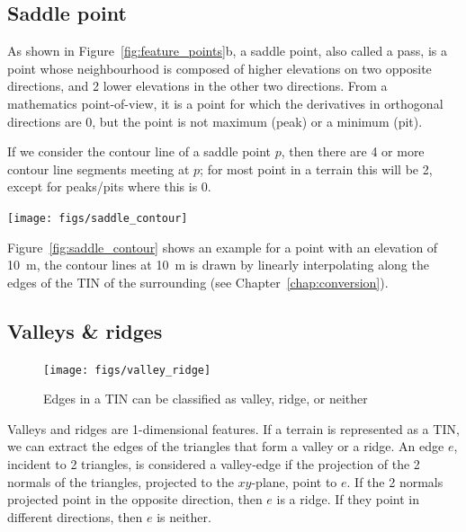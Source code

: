 \subsection{Saddle point}%

As shown in Figure~\ref{fig:feature_points}b, a saddle point, also called a pass, is a point whose neighbourhood is composed of higher elevations on two opposite directions, and 2 lower elevations in the other two directions.
From a mathematics point-of-view, it is a point for which the derivatives in orthogonal directions are 0, but the point is not maximum (peak) or a minimum (pit).

%

If we consider the contour line of a saddle point $p$, then there are 4 or more contour line segments meeting at $p$; for most point in a terrain this will be 2, except for peaks/pits where this is 0.
\begin{marginfigure}
  \centering
  \texttt{[image: figs/saddle\_contour]}
  \caption{A saddle point at elevation \qty{10}{\m}, and its surrounding points. The triangulation of the area is created and used to extract the contour line segments at \qty{10}{\m} (red lines).}%
\label{fig:saddle_contour}
\end{marginfigure}
Figure~\ref{fig:saddle_contour} shows an example for a point with an elevation of \qty{10}{\m}, the contour lines at \qty{10}{\m} is drawn by linearly interpolating along the edges of the TIN of the surrounding (see Chapter~\ref{chap:conversion}).


\subsection{Valleys \& ridges}

\begin{figure}
  \centering
  \texttt{[image: figs/valley\_ridge]}
  \caption{Edges in a TIN can be classified as valley, ridge, or neither}%
\label{fig:valley_ridge}
\end{figure}
Valleys and ridges are 1-dimensional features.
If a terrain is represented as a TIN, we can extract the edges of the triangles that form a valley or a ridge.
An edge $e$, incident to 2 triangles, is considered a valley-edge if the projection of the 2 normals of the triangles, projected to the $xy$-plane, point to $e$.
If the 2 normals projected point in the opposite direction, then $e$ is a ridge.
If they point in different directions, then $e$ is neither.



